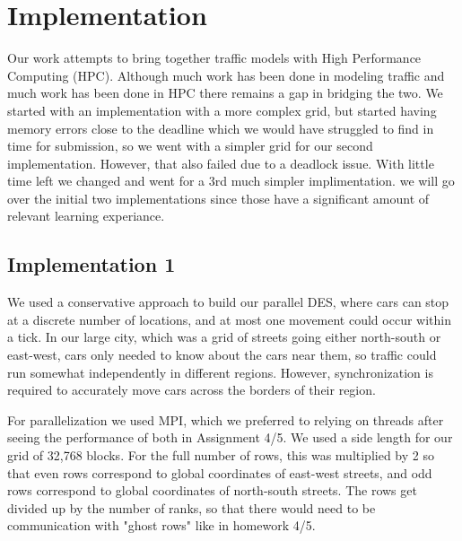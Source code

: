 \documentclass[10pt,a4paper]{article}
\begin{document}
\section{Implementation}

Our work attempts to bring together traffic models with High Performance Computing (HPC). Although much work has been done in modeling traffic and much work has been done in HPC there remains a gap in bridging the two. We started with an implementation with a more complex grid, but started having memory errors close to the deadline which we would have struggled to find in time for submission, so we went with a simpler grid for our second implementation. However, that also failed due to a deadlock issue. With little time left we changed and went for a 3rd much simpler implimentation. we will go over the initial two implementations since those have a significant amount of relevant learning experiance.

\subsection{Implementation 1}

We used a conservative approach to build our parallel DES, where cars can stop at a discrete number of locations, and at most one movement could occur within a tick. In our large city, which was a grid of streets going either north-south or east-west, cars only needed to know about the cars near them, so traffic could run somewhat independently in different regions. However, synchronization is required to accurately move cars across the borders of their region.

For parallelization we used MPI, which we preferred to relying on threads after seeing the performance of both in Assignment 4/5. We used a side length for our grid of 32,768 blocks. For the full number of rows, this was multiplied by 2 so that even rows correspond to global coordinates of east-west streets, and odd rows correspond to global coordinates of north-south streets. The rows get divided up by the number of ranks, so that there would need to be communication with "ghost rows" like in homework 4/5.
\end{document}

